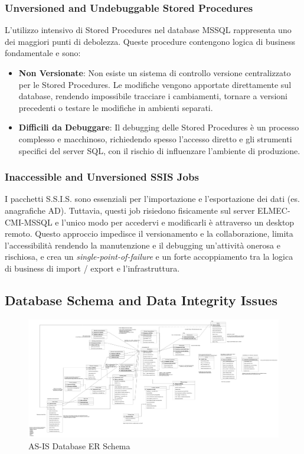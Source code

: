 \subsubsection{Unversioned and Undebuggable Stored Procedures}
L'utilizzo intensivo di Stored Procedures nel database MSSQL rappresenta uno dei maggiori punti di debolezza. Queste procedure contengono logica di business fondamentale e sono:
\begin{itemize}
    \item \textbf{Non Versionate}: Non esiste un sistema di controllo versione centralizzato per le Stored Procedures. Le modifiche vengono apportate direttamente sul database, rendendo impossibile tracciare i cambiamenti, tornare a versioni precedenti o testare le modifiche in ambienti separati.
    \item \textbf{Difficili da Debuggare}: Il debugging delle Stored Procedures è un processo complesso e macchinoso, richiedendo spesso l'accesso diretto e gli strumenti specifici del server SQL, con il rischio di influenzare l'ambiente di produzione.
\end{itemize}

\subsubsection{Inaccessible and Unversioned SSIS Jobs}
I pacchetti S.S.I.S. sono essenziali per l'importazione e l'esportazione dei dati (es. anagrafiche AD). Tuttavia, questi job risiedono fisicamente sul server ELMEC-CMI-MSSQL e l'unico modo per accedervi e modificarli è attraverso un desktop remoto. Questo approccio impedisce il versionamento e la collaborazione, limita l'accessibilità rendendo la manutenzione e il debugging un'attività onerosa e rischiosa, e crea un \textit{single-point-of-failure} e un forte accoppiamento tra la logica di business di import / export e l'infrastruttura.

\subsection{Database Schema and Data Integrity Issues}

\begin{figure}[htbp]
    \centering
    \includegraphics[width=\textwidth, keepaspectratio]{images/as-is/ER SRM-SRP AS-IS.drawio.png}
    \caption{AS-IS Database ER Schema}
    \label{fig:er-as-is}
\end{figure}

